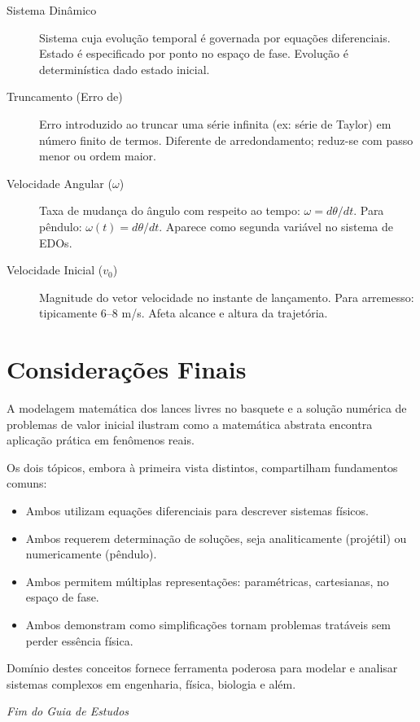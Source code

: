 \documentclass[12pt,a4paper]{article}
\begin{document}
\begin{description}
    \item[Sistema Dinâmico] Sistema cuja evolução temporal é governada por equações diferenciais. Estado é especificado por ponto no espaço de fase. Evolução é determinística dado estado inicial.
    
    \item[Truncamento (Erro de)] Erro introduzido ao truncar uma série infinita (ex: série de Taylor) em número finito de termos. Diferente de arredondamento; reduz-se com passo menor ou ordem maior.
    
    \item[Velocidade Angular ($\omega$)] Taxa de mudança do ângulo com respeito ao tempo: $\omega = d\theta/dt$. Para pêndulo: $\omega(t) = d\theta/dt$. Aparece como segunda variável no sistema de EDOs.
    
    \item[Velocidade Inicial ($v_0$)] Magnitude do vetor velocidade no instante de lançamento. Para arremesso: tipicamente 6--8 m/s. Afeta alcance e altura da trajetória.
    
\end{description}

\newpage


\section*{Considerações Finais}

A modelagem matemática dos lances livres no basquete e a solução numérica de problemas de valor inicial ilustram como a matemática abstrata encontra aplicação prática em fenômenos reais. 

Os dois tópicos, embora à primeira vista distintos, compartilham fundamentos comuns:
\begin{itemize}
    \item Ambos utilizam equações diferenciais para descrever sistemas físicos.
    \item Ambos requerem determinação de soluções, seja analiticamente (projétil) ou numericamente (pêndulo).
    \item Ambos permitem múltiplas representações: paramétricas, cartesianas, no espaço de fase.
    \item Ambos demonstram como simplificações tornam problemas tratáveis sem perder essência física.
\end{itemize}

Domínio destes conceitos fornece ferramenta poderosa para modelar e analisar sistemas complexos em engenharia, física, biologia e além.

\vfill
\begin{center}
\textit{Fim do Guia de Estudos}
\end{center}
\end{document}
